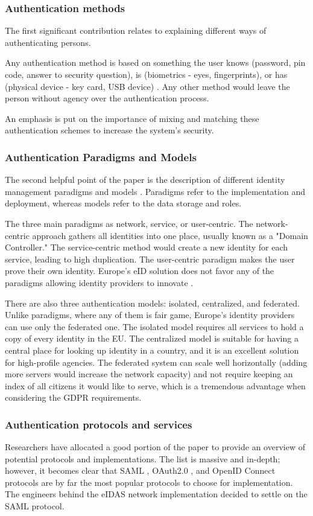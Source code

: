 \subsubsection{Authentication methods}

The first significant contribution relates to explaining different ways of authenticating persons.

Any authentication method is based on something the user knows (password, pin code, answer to security question), is (biometrics - eyes, fingerprints), or has (physical device - key card, USB device) \cite{o2003comparing}. Any other method would leave the person without agency over the authentication process.

An emphasis is put on the importance of mixing and matching these authentication schemes to increase the system's security.

\subsubsection{Authentication Paradigms and Models}

The second helpful point of the paper is the description of different identity management paradigms and models \cite{identity-paradigms}. Paradigms refer to the implementation and deployment, whereas models refer to the data storage and roles.

The three main paradigms as network, service, or user-centric. The network-centric approach gathers all identities into one place, usually known as a "Domain Controller." The service-centric method would create a new identity for each service, leading to high duplication. The user-centric paradigm makes the user prove their own identity. Europe's eID solution does not favor any of the paradigms allowing identity providers to innovate \cite{eelaw-idcard,eeid,dokobit}.

There are also three authentication models: isolated, centralized, and federated. Unlike paradigms, where any of them is fair game, Europe's identity providers can use only the federated one. The isolated model requires all services to hold a copy of every identity in the EU. The centralized model is suitable for having a central place for looking up identity in a country, and it is an excellent solution for high-profile agencies. The federated system can scale well horizontally (adding more servers would increase the network capacity) and not require keeping an index of all citizens it would like to serve, which is a tremendous advantage when considering the GDPR requirements.

\subsubsection{Authentication protocols and services}

Researchers have allocated a good portion of the paper to provide an overview of potential protocols and implementations. The list is massive and in-depth; however, it becomes clear that SAML \cite{saml}, OAuth2.0 \cite{rfc6749}, and OpenID Connect \cite{oidc} protocols are by far the most popular protocols to choose for implementation. The engineers behind the eIDAS network implementation decided to settle on the SAML protocol.
